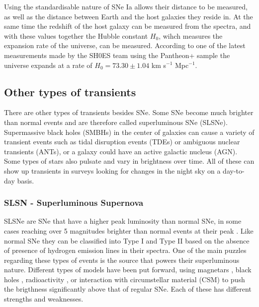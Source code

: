 \documentclass[a4paper,oneside,12pt, class=Latex/Classes/PhDthesisPSnPDF, crop=false]{standalone}
\begin{document}
Using the standardisable nature of SNe Ia allows their distance to be measured, as well as the distance between Earth and the host galaxies they reside in. At the same time the redshift of the host galaxy can be measured from the spectra, and with these values together the Hubble constant $H_0$, wihch measures the expansion rate of the universe, can be measured. According to one of the latest measurements made by the SH0ES team \citep{SH0ES} using the Pantheon+ sample \citep{Pantheon+} the universe expands at a rate of $H_0 = 73.30 \pm 1.04$ km s$^{-1}$ Mpc$^{-1}$.


\subsection{Other types of transients}
There are other types of transients besides SNe. Some SNe become much brighter than normal events and are therefore called superluminous SNe (SLSNe). Supermassive black holes (SMBHs) in the center of galaxies can cause a variety of transient events such as tidal disruption events (TDEs) or ambiguous nuclear transients (ANTs), or a galaxy could have an active galactic nucleus (AGN). Some types of stars also pulsate and vary in brightness over time. All of these can show up transients in surveys looking for changes in the night sky on a day-to-day basis.


\subsubsection{SLSN - Superluminous Supernova}
SLSNe are SNe that have a higher peak luminosity than normal SNe, in some cases reaching over 5 magnitudes brighter than normal events at their peak \citep{SLSN_Gal-Yam}. Like normal SNe they can be classified into Type I and Type II based on the absence of presence of hydrogen emission lines in their spectra. One of the main puzzles regarding these types of events is the source that powers their superluminous nature. Different types of models have been put forward, using magnetars \citep{Maeda_SLSN_magentar}, black holes \citep{SLSN_BH}, radioactivity \citep{Kasen_SLSN_pair_instab}, or interaction with circumstellar material (CSM) \citep{Late-time_CSM_SLSNE_I} to push the brigthness significantly above that of regular SNe. Each of these has different strengths and weaknesses.
\end{document}
